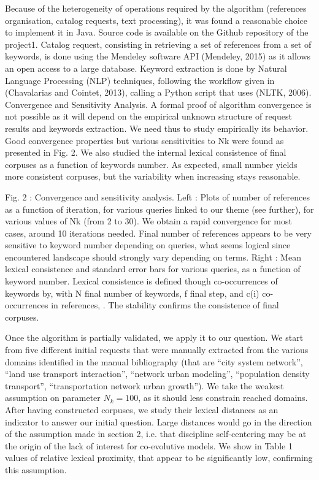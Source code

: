 Because of the heterogeneity of operations required by the algorithm (references organisation, catalog requests, text processing), it was found a reasonable choice to implement it in Java. Source code is available on the Github repository of the project1. Catalog request, consisting in retrieving a set of references from a set of keywords, is done using the Mendeley software API (Mendeley, 2015) as it allows an open access to a large database. Keyword extraction is done by Natural Language Processing (NLP) techniques, following the workflow given in (Chavalarias and Cointet, 2013), calling a Python script that uses (NLTK, 2006).
Convergence and Sensitivity Analysis. A formal proof of algorithm convergence is not possible as it will depend on the empirical unknown structure of request results and keywords extraction. We need thus to study empirically its behavior. Good convergence properties but various sensitivities to Nk were found as presented in Fig. 2. We also studied the internal lexical consistence of final corpuses as a function of keywords number. As expected, small number yields more consistent corpuses, but the variability when increasing stays reasonable.




Fig. 2 : Convergence and sensitivity analysis. Left : Plots of number of references as a function of iteration, for various queries linked to our theme (see further), for various values of Nk (from 2 to 30). We obtain a rapid convergence for most cases, around 10 iterations needed. Final number of references appears to be very sensitive to keyword number depending on queries, what seems logical since encountered landscape should strongly vary depending on terms. Right : Mean lexical consistence and standard error bars for various queries, as a function of keyword number. Lexical consistence is defined though co-occurrences of keywords by, with N final number of keywords, f final step, and c(i) co-occurrences in references, . The stability confirms the consistence of final corpuses.



Once the algorithm is partially validated, we apply it to our question. We start from five different initial requests that were manually extracted from the various domains identified in the manual bibliography (that are ``city system network'', ``land use transport interaction'', ``network urban modeling'', ``population density transport'', ``transportation network urban growth''). We take the weakest assumption on parameter $N_k = 100$, as it should less  constrain reached domains. After having constructed corpuses, we study their lexical distances as an indicator to answer our initial question. Large distances would go in the direction of the assumption made in section 2, i.e. that discipline self-centering may be at the origin of the lack of interest for co-evolutive models. We show in Table 1 values of relative lexical proximity, that appear to be significantly low,  confirming this assumption.

